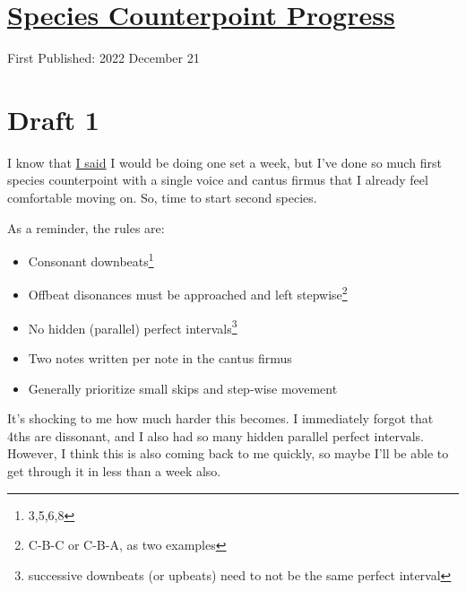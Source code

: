 \documentclass[12pt]{article}[titlepage]
\newcommand{\1}{\={a}}
\newcommand{\2}{\={e}}
\newcommand{\3}{\={\i}}
\newcommand{\4}{\=o}
\newcommand{\5}{\=u}
\newcommand{\6}{\={A}}
\renewcommand{\,}{\textsuperscript{,}}
\begin{document}
\doublespacing
\section{\href{species-counterpoint-2.html}{Species Counterpoint Progress}}
First Published: 2022 December 21

\section{Draft 1}
I know that \href{species-counterpoint-planning.html}{I said} I would be doing one set a week, but I've done so much first species counterpoint with a single voice and cantus firmus that I already feel comfortable moving on.
So, time to start second species.

As a reminder, the rules are:
\begin{itemize}
\item Consonant downbeats\footnote{3,5,6,8}
\item Offbeat disonances must be approached and left stepwise\footnote{C-B-C or C-B-A, as two examples}
\item No hidden (parallel) perfect intervals\footnote{successive downbeats (or upbeats) need to not be the same perfect interval}
\item Two notes written per note in the cantus firmus
\item Generally prioritize small skips and step-wise movement
\end{itemize}
It's shocking to me how much harder this becomes.
I immediately forgot that 4ths are dissonant, and I also had so many hidden parallel perfect intervals.
However, I think this is also coming back to me quickly, so maybe I'll be able to get through it in less than a week also.
\end{document}
